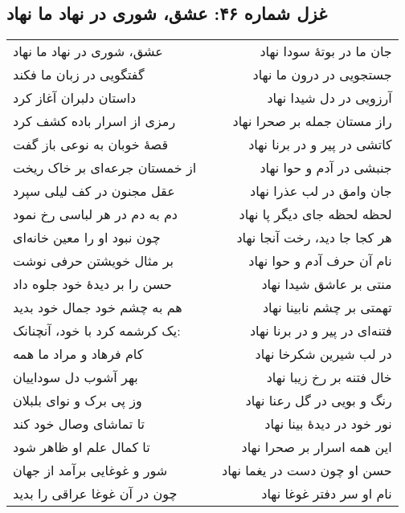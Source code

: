 \begin{center}
\section*{غزل شماره ۴۶: عشق، شوری در نهاد ما نهاد}
\label{sec:046}
\begin{longtable}{l p{0.5cm} r}
عشق، شوری در نهاد ما نهاد
&&
جان ما در بوتهٔ سودا نهاد
\\
گفتگویی در زبان ما فکند
&&
جستجویی در درون ما نهاد
\\
داستان دلبران آغاز کرد
&&
آرزویی در دل شیدا نهاد
\\
رمزی از اسرار باده کشف کرد
&&
راز مستان جمله بر صحرا نهاد
\\
قصهٔ خوبان به نوعی باز گفت
&&
کاتشی در پیر و در برنا نهاد
\\
از خمستان جرعه‌ای بر خاک ریخت
&&
جنبشی در آدم و حوا نهاد
\\
عقل مجنون در کف لیلی سپرد
&&
جان وامق در لب عذرا نهاد
\\
دم به دم در هر لباسی رخ نمود
&&
لحظه لحظه جای دیگر پا نهاد
\\
چون نبود او را معین خانه‌ای
&&
هر کجا جا دید، رخت آنجا نهاد
\\
بر مثال خویشتن حرفی نوشت
&&
نام آن حرف آدم و حوا نهاد
\\
حسن را بر دیدهٔ خود جلوه داد
&&
منتی بر عاشق شیدا نهاد
\\
هم به چشم خود جمال خود بدید
&&
تهمتی بر چشم نابینا نهاد
\\
یک کرشمه کرد با خود، آنچنانک:
&&
فتنه‌ای در پیر و در برنا نهاد
\\
کام فرهاد و مراد ما همه
&&
در لب شیرین شکرخا نهاد
\\
بهر آشوب دل سوداییان
&&
خال فتنه بر رخ زیبا نهاد
\\
وز پی برک و نوای بلبلان
&&
رنگ و بویی در گل رعنا نهاد
\\
تا تماشای وصال خود کند
&&
نور خود در دیدهٔ بینا نهاد
\\
تا کمال علم او ظاهر شود
&&
این همه اسرار بر صحرا نهاد
\\
شور و غوغایی برآمد از جهان
&&
حسن او چون دست در یغما نهاد
\\
چون در آن غوغا عراقی را بدید
&&
نام او سر دفتر غوغا نهاد
\\
\end{longtable}
\end{center}
